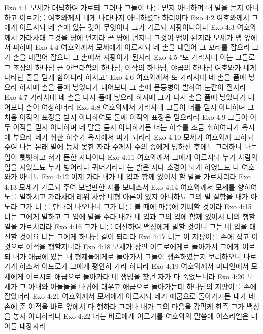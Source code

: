 Exo 4:1  모세가 대답하여 가로되 그러나 그들이 나를 믿지 아니하며 내 말을 듣지 아니하고 이르기를 여호와께서 네게 나타나지 아니하셨다 하리이다
Exo 4:2  여호와께서 그에게 이르시되 네 손에 있는 것이 무엇이냐 그가 가로되 지팡이니이다
Exo 4:3  여호와께서 가라사대 그것을 땅에 던지라 곧 땅에 던지니 그것이 뱀이 된지라 모세가 뱀 앞에서 피하매
Exo 4:4  여호와께서 모세에게 이르시되 네 손을 내밀어 그 꼬리를 잡으라 그가 손을 내밀어 잡으니 그 손에서 지팡이가 된지라
Exo 4:5  "또 가라사대 이는 그들로 그 조상의 하나님 곧 아브라함의 하나님, 이삭의 하나님, 야곱의 하나님 여호와가 네게 나타난 줄을 믿게 함이니라 하시고"
Exo 4:6  여호와께서 또 가라사대 네 손을 품에 넣으라 하시매 손을 품에 넣었다가 내어보니 그 손에 문둥병이 발하여 눈같이 흰지라
Exo 4:7  가라사대 네 손을 다시 품에 넣으라 하시매 그가 다시 손을 품에 넣었다가 내어보니 손이 여상하더라
Exo 4:8  여호와께서 가라사대 그들이 너를 믿지 아니하며 그 처음 이적의 표징을 받지 아니하여도 둘째 이적의 표징은 믿으리라
Exo 4:9  그들이 이 두 이적을 믿지 아니하며 네 말을 듣지 아니하거든 너는 하수를 조금 취하여다가 육지에 부으라 네가 취한 하수가 육지에서 피가 되리라
Exo 4:10  모세가 여호와께 고하되 주여 나는 본래 말에 능치 못한 자라 주께서 주의 종에게 명하신 후에도 그러하니 나는 입이 뻣뻣하고 혀가 둔한 자니이다
Exo 4:11  여호와께서 그에게 이르시되 누가 사람의 입을 지었느뇨 누가 벙어리나 귀머거리나 눈 밝은 자나 소경이 되게 하였느뇨 나 여호와가 아니뇨
Exo 4:12  이제 가라 내가 네 입과 함께 있어서 할 말을 가르치리라
Exo 4:13  모세가 가로되 주여 보낼만한 자를 보내소서
Exo 4:14  여호와께서 모세를 향하여 노를 발하시고 가라사대 레위 사람 네형 아론이 있지 아니하뇨 그의 말 잘함을 내가 아노라 그가 너 를 만나러 나오나니 그가 너를 볼 때에 마음에 기뻐할 것이라
Exo 4:15  너는 그에게 말하고 그 입에 말을 주라 내가 네 입과 그의 입에 함께 있어서 너의 행할 일을 가르치리라
Exo 4:16  그가 너를 대신하여 백성에게 말할 것이니 그는 네 입을 대신할 것이요 너는 그에게 하나님 같이 되리라
Exo 4:17  너는 이 지팡이를 손에 잡고 이것으로 이적을 행할지니라
Exo 4:18  모세가 장인 이드로에게로 돌아가서 그에게 이르되 내가 애굽에 있는 내 형제들에게로 돌아가서 그들이 생존하였는지 보려하오니 나로 가게 하소서 이드로가 그에게 평안히 가라 하니라
Exo 4:19  여호와께서 미디안에서 모세에게 이르시되 애굽으로 돌아가라 네 생명을 찾던 자가 다 죽었느니라
Exo 4:20  모세가 그 아내와 아들들을 나귀에 태우고 애굽으로 돌아가는데 하나님의 지팡이를 손에 잡았더라
Exo 4:21  여호와께서 모세에게 이르시되 네가 애굽으로 돌아가거든 내가 네 손에 준 이적을 바로 앞에서 다 행하라 그러나 내가 그의 마음을 강퍅케 한즉 그가 백성을 놓지 아니하리니
Exo 4:22  너는 바로에게 이르기를 여호와의 말씀에 이스라엘은 내 아들 내장자라
